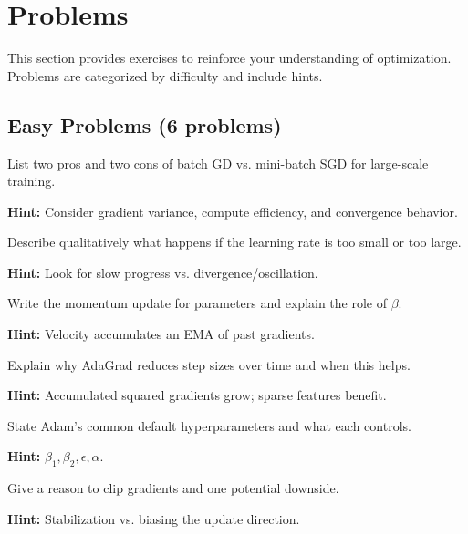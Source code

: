 
\section{Problems}
\label{sec:ch8-problems}

This section provides exercises to reinforce your understanding of optimization. Problems are categorized by difficulty and include hints.

\subsection{Easy Problems (6 problems)}

\begin{problem}
List two pros and two cons of batch GD vs. mini-batch SGD for large-scale training.

\textbf{Hint:} Consider gradient variance, compute efficiency, and convergence behavior.
\end{problem}

\begin{problem}
Describe qualitatively what happens if the learning rate is too small or too large.

\textbf{Hint:} Look for slow progress vs. divergence/oscillation.
\end{problem}

\begin{problem}
Write the momentum update for parameters and explain the role of $\beta$.

\textbf{Hint:} Velocity accumulates an EMA of past gradients.
\end{problem}

\begin{problem}
Explain why AdaGrad reduces step sizes over time and when this helps.

\textbf{Hint:} Accumulated squared gradients grow; sparse features benefit.
\end{problem}

\begin{problem}
State Adam's common default hyperparameters and what each controls.

\textbf{Hint:} $\beta_1,\beta_2,\epsilon,\alpha$.
\end{problem}

\begin{problem}
Give a reason to clip gradients and one potential downside.

\textbf{Hint:} Stabilization vs. biasing the update direction.
\end{problem}

